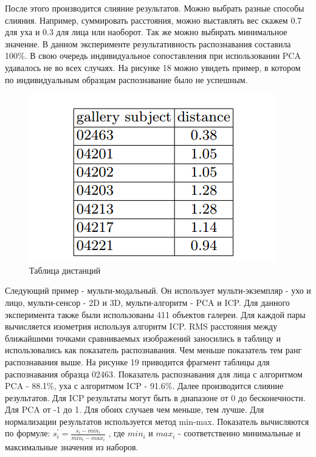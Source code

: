 \documentclass[12pt,a4paper]{article}					%
\begin{document}
После этого производится слияние результатов.
Можно выбрать разные способы слияния.
Например, суммировать расстояния, можно выставлять вес скажем 0.7 для уха и 0.3 для лица или наоборот. 
Так же можно выбирать минимальное значение.
В данном эксперименте результативность распознавания составила 100\%.
В свою очередь индивидуальное сопоставления при использовании PCA удавалось не во всех случаях.
На рисунке 18 можно увидеть пример, в котором по индивидуальным образцам распознавание было не успешным.

\begin{figure}[h!]
\centering
\includegraphics[scale=0.60]{res/distances_table_2}
\caption{Таблица дистанций}
\end{figure}

Следующий пример - мульти-модальный.
Он использует мульти-экземпляр - ухо и лицо, мульти-сенсор - 2D и 3D, мульти-алгоритм - PCA и ICP.
Для данного эксперимента также были использованы 411 объектов галереи.
Для каждой пары вычисляется изометрия используя алгоритм ICP.
RMS расстояния между ближайшими точками сравниваемых изображений заносились в таблицу и использовались как показатель распознавания.
Чем меньше показатель тем ранг распознавания выше.
На рисунке 19 приводится фрагмент таблицы для распознавания образца 02463.
Показатель распознавания для лица с алгоритмом PCA - 88.1\%, уха с алгоритмом ICP - 91.6\%.
Далее производится слияние результатов.
Для ICP результаты могут быть в диапазоне от 0 до бесконечности.
Для PCA от -1 до 1.
Для обоих случаев чем меньше, тем лучше.
Для нормализации результатов используется метод min-max.
Показатель вычисляются по формуле:
$s_i^\prime = \frac{s_i - min_i}{min_i - max_i}$
, где $min_i$ и $max_i$ - соответственно минимальные и максимальные значения из наборов.
\end{document}
